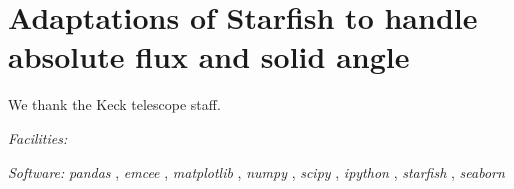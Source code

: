 \documentclass[twocolumn]{emulateapj}%
\newcommand{\project}[1]{\textsl{#1}}
\begin{document}
\clearpage
\pagebreak


\appendix

\section{Adaptations of Starfish to handle absolute flux and solid angle}

\acknowledgements
We thank the Keck telescope staff. 

{\it Facilities:} 

{\it Software: } 
 \project{pandas} \citep{mckinney10},
 \project{emcee} \citep{foreman13},
 \project{matplotlib} \citep{hunter07},
 \project{numpy} \citep{vanderwalt11},
 \project{scipy} \citep{jones01},
 \project{ipython} \citep{perez07},
 \project{starfish} \citep{czekala15},
 \project{seaborn} \citep{waskom14}

\clearpage



\end{document}
